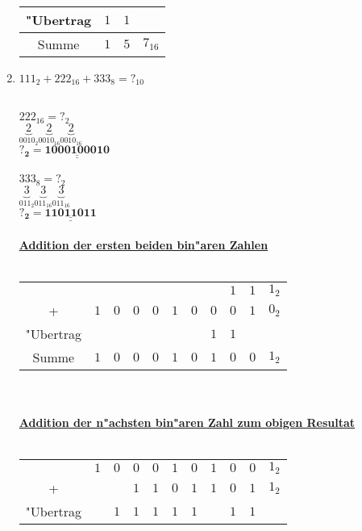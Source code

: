 \documentclass[a4paper,10pt]{article}
\def\doubleunderline#1{\underline{\underline{#1}}}
\begin{document}
\begin{enumerate}
{\begin{tabular}{c@{\,}c@{\,}c@{\,}c}
		\hline
		"Ubertrag  & $1$ & $1$  &  \\
		\hline
		Summe & $1$ & $5$ & $7_{16}$ \\
		\hline
		\hline		
		\end{tabular}		 
	 }
\item $111_{2} + 222_{16} + 333_{8} = ?_{10}$ \\  \\   %
	 {\color{ForestGreen}
	 	 $222_{16} = ?_{2}$ \\
		 $\underbrace{2}_\text{$0010_{2}$}\underbrace{2}_\text{$0010_{16}$}\underbrace{2}_\text{$0010_{16}$}$ \\
		 $\mathbf{?_{2} = \doubleunderline{1000100010}}$ \\
		 \\
	 	 $333_{8} = ?_{2}$ \\
		 $\underbrace{3}_\text{$011_{2}$}\underbrace{3}_\text{$011_{16}$}\underbrace{3}_\text{$011_{16}$}$ \\
		 $\mathbf{?_{2} = \doubleunderline{11011011}}$ \\
		 \\
		 \textbf{\underline{Addition der ersten beiden bin"aren Zahlen}} \\
		 \\
		 \begin{tabular}{c@{\,}c@{\,}c@{\,}c@{\,}c@{\,}c@{\,}c@{\,}c@{\,}c@{\,}c@{\,}c}
		&  &  &  &  &  &  &  &  $1$ & $1$ & $1_{2}$ \\
		+ & $1$ & $0$ & $0$ & $0$ & $1$& $0$ & $0$ & $0$ & $1$ & $0_{2}$ \\
		\hline
		"Ubertrag  & & & & & & & $1$ & $1$ &  &  \\
		\hline
		Summe & $1$ & $0$ & $0$ & $0$ & $1$ & $0$ & $1$ & $0$ & $0$ & $1_{2}$ \\
		\hline
		\hline		
		\end{tabular}
		\\
		\vspace{4mm}
		\\
		 \textbf{\underline{Addition der n"achsten bin"aren Zahl zum obigen Resultat}} \\
		 \\
		 \begin{tabular}{c@{\,}c@{\,}c@{\,}c@{\,}c@{\,}c@{\,}c@{\,}c@{\,}c@{\,}c@{\,}c}
		& $1$ & $0$ & $0$ & $0$ & $1$ & $0$ & $1$ & $0$ & $0$ & $1_{2}$ \\
		+ & & & $1$ & $1$ & $0$& $1$ & $1$ & $0$ & $1$ & $1_{2}$ \\
		\hline
		"Ubertrag  & & $1$ & $1$ & $1$ & $1$ & $1$ & & $1$ & $1$  &  \\

\end{tabular}}
\end{enumerate}
\end{document}

